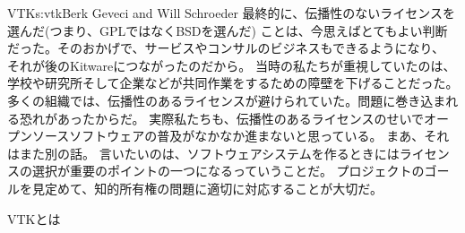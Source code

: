 \begin{aosachapter}{VTK}{s:vtk}{Berk Geveci and Will Schroeder}
最終的に、伝播性のないライセンスを選んだ(つまり、GPLではなくBSDを選んだ)
ことは、今思えばとてもよい判断だった。そのおかげで、サービスやコンサルのビジネスもできるようになり、
それが後のKitwareにつながったのだから。
当時の私たちが重視していたのは、学校や研究所そして企業などが共同作業をするための障壁を下げることだった。
多くの組織では、伝播性のあるライセンスが避けられていた。問題に巻き込まれる恐れがあったからだ。
実際私たちも、伝播性のあるライセンスのせいでオープンソースソフトウェアの普及がなかなか進まないと思っている。
まあ、それはまた別の話。
言いたいのは、ソフトウェアシステムを作るときにはライセンスの選択が重要のポイントの一つになるっていうことだ。
プロジェクトのゴールを見定めて、知的所有権の問題に適切に対応することが大切だ。

\begin{aosasect1}{VTKとは}


\end{aosasect1}
\end{aosachapter}
